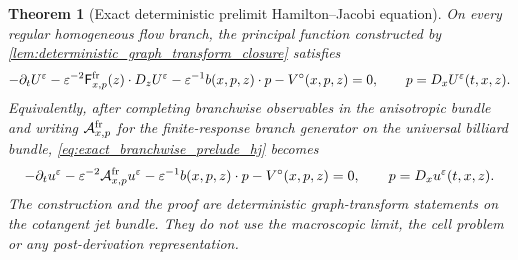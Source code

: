 \documentclass[12pt, letterpaper]{amsart}
\newcommand{\Acal}{\mathcal{A}}
\newcommand{\Ffast}{\mathsf F}
\theoremstyle{plain}
\newtheorem{theorem}{Theorem}[section]
\theoremstyle{definition}
\theoremstyle{remark}
\begin{document}
\begin{theorem}[Exact deterministic prelimit Hamilton--Jacobi equation]
\label{thm:exact_prelude_hj}
On every regular homogeneous flow branch, the principal function constructed by
\cref{lem:deterministic_graph_transform_closure} satisfies
\begin{equation}
\label{eq:exact_branchwise_prelude_hj}
    -\partial_tU^\varepsilon
    -\varepsilon^{-2}\Ffast^{\rm fr}_{x,p}(z)\cdot D_zU^\varepsilon
    -\varepsilon^{-1}b(x,p,z)\cdot p
    -V^\circ(x,p,z)=0,
    \qquad p=D_xU^\varepsilon(t,x,z).
\end{equation}
Equivalently, after completing branchwise observables in the anisotropic bundle
and writing $\Acal^{\rm fr}_{x,p}$ for the finite-response branch generator on
the universal billiard bundle, \eqref{eq:exact_branchwise_prelude_hj} becomes
\begin{equation}
\label{eq:prelimit_from_action_principle}
    -\partial_t u^\varepsilon
    -\varepsilon^{-2}\Acal^{\rm fr}_{x,p}u^\varepsilon
    -\varepsilon^{-1}b(x,p,z)\cdot p
    -V^\circ(x,p,z)=0,
    \qquad p=D_xu^\varepsilon(t,x,z).
\end{equation}
The construction and the proof are deterministic graph-transform statements on
the cotangent jet bundle.  They do not use the macroscopic limit, the cell
problem or any post-derivation representation.
\end{theorem}
\end{document}
